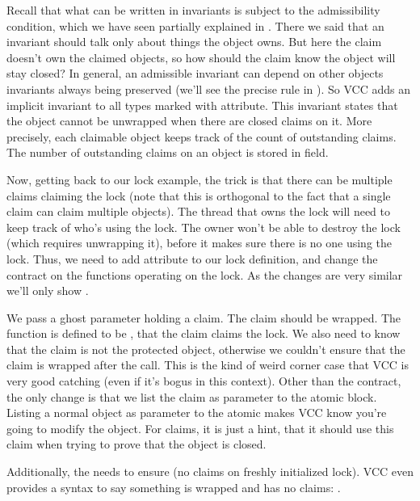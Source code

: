 Recall that what can be written in invariants is subject to the admissibility
condition, which we have seen partially explained in .
There we said that an invariant should talk only about things the object owns.
But here the claim doesn't own the claimed objects,
so how should the claim know the object will stay closed?
In general, an admissible invariant can depend on other objects invariants always being
preserved (we'll see the precise rule in ).
So VCC adds an implicit invariant to all types
marked with  attribute.
This invariant states that the object cannot be unwrapped when
there are closed claims on it.
More precisely, each claimable object keeps track of the count of outstanding
claims.
The number of outstanding claims on an object is stored in
 field.

Now, getting back to our lock example, the trick is that there can be
multiple claims claiming the lock (note that this is orthogonal to
the fact that a single claim can claim multiple objects).
The thread that owns the lock will need to keep track of who's using
the lock.
The owner won't be able to destroy the lock (which requires unwrapping it),
before it makes sure there is no one using the lock.
Thus, we need to add  attribute to our lock
definition, and change the contract on the functions operating
on the lock. As the changes are very similar we'll only
show .


\noindent
We pass a ghost parameter holding a claim.
The claim should be wrapped.
The function  is defined to be
, \ie that the claim claims the lock.
We also need to know that the claim is not the protected object,
otherwise we couldn't ensure that the claim is wrapped after the call.
This is the kind of weird corner case that VCC is very good catching
(even if it's bogus in this context).
Other than the contract, the only change is that we list the claim
as parameter to the atomic block.
Listing a normal object as parameter to the atomic makes VCC know you're
going to modify the object.
For claims, it is just a hint, that it should use this claim when trying
to prove that the object is closed.

Additionally, the  needs to ensure  
(\ie no claims on freshly initialized lock).
VCC even provides a syntax to say something is wrapped and has no claims: .

